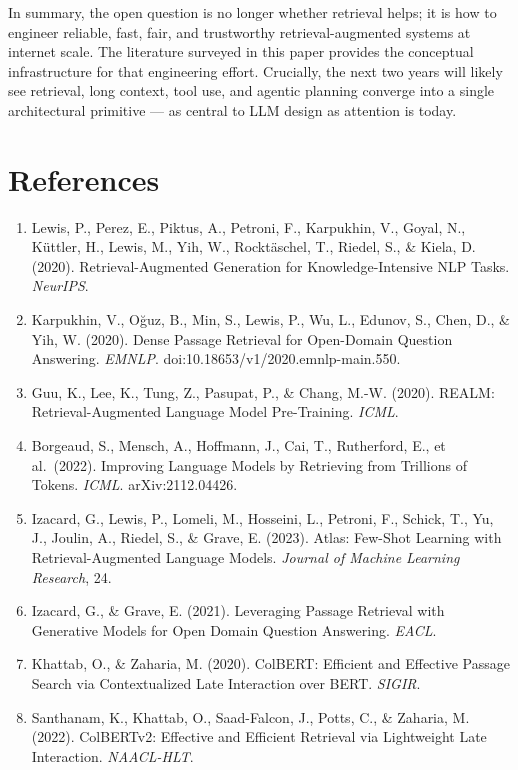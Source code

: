 In summary, the open question is no longer whether retrieval helps; it is how to engineer reliable, fast, fair, and trustworthy retrieval-augmented systems at internet scale. The literature surveyed in this paper provides the conceptual infrastructure for that engineering effort. Crucially, the next two years will likely see retrieval, long context, tool use, and agentic planning converge into a single architectural primitive --- as central to LLM design as attention is today.

\section{References}\label{references}

\begin{enumerate}
\def\labelenumi{\arabic{enumi}.}
\item
  Lewis, P., Perez, E., Piktus, A., Petroni, F., Karpukhin, V., Goyal, N., Küttler, H., Lewis, M., Yih, W., Rocktäschel, T., Riedel, S., \& Kiela, D. (2020). Retrieval-Augmented Generation for Knowledge-Intensive NLP Tasks. \emph{NeurIPS}.
\item
  Karpukhin, V., Oğuz, B., Min, S., Lewis, P., Wu, L., Edunov, S., Chen, D., \& Yih, W. (2020). Dense Passage Retrieval for Open-Domain Question Answering. \emph{EMNLP}. doi:10.18653/v1/2020.emnlp-main.550.
\item
  Guu, K., Lee, K., Tung, Z., Pasupat, P., \& Chang, M.-W. (2020). REALM: Retrieval-Augmented Language Model Pre-Training. \emph{ICML}.
\item
  Borgeaud, S., Mensch, A., Hoffmann, J., Cai, T., Rutherford, E., et al.~(2022). Improving Language Models by Retrieving from Trillions of Tokens. \emph{ICML}. arXiv:2112.04426.
\item
  Izacard, G., Lewis, P., Lomeli, M., Hosseini, L., Petroni, F., Schick, T., Yu, J., Joulin, A., Riedel, S., \& Grave, E. (2023). Atlas: Few-Shot Learning with Retrieval-Augmented Language Models. \emph{Journal of Machine Learning Research}, 24.
\item
  Izacard, G., \& Grave, E. (2021). Leveraging Passage Retrieval with Generative Models for Open Domain Question Answering. \emph{EACL}.
\item
  Khattab, O., \& Zaharia, M. (2020). ColBERT: Efficient and Effective Passage Search via Contextualized Late Interaction over BERT. \emph{SIGIR}.
\item
  Santhanam, K., Khattab, O., Saad-Falcon, J., Potts, C., \& Zaharia, M. (2022). ColBERTv2: Effective and Efficient Retrieval via Lightweight Late Interaction. \emph{NAACL-HLT}.

\end{enumerate}
